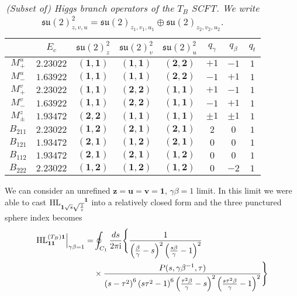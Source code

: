 \documentclass[main.tex]{subfiles}
\begin{document}
\begin{table}
\centering
\begin{tabular}{|c |c|c|c|c|c|c| c|} 
 \hline
 &$E_c$&$\mathfrak{su}(2)^2_{z}$&$\mathfrak{su}(2)_{v}^2$&$\mathfrak{su}(2)^2_{u}$&$q_{\gamma}$&$q_{\beta}$&$q_{t}$\\
  \hline\hline
$M^{u}_{+}$&$2.23022$&$(\mathbf{1},\mathbf{1})$&$(\mathbf{1},\mathbf{1})$&$(\mathbf{2},\mathbf{2})$&$+1$&$-1$&$1$\\
$M^{u}_{-}$&$1.63922$&$(\mathbf{1},\mathbf{1})$&$(\mathbf{1},\mathbf{1})$&$(\mathbf{2},\mathbf{2})$&$-1$&$+1$&$1$\\
$M^{v}_{+}$&$2.23022$&$(\mathbf{1},\mathbf{1})$&$(\mathbf{2},\mathbf{2})$&$(\mathbf{1},\mathbf{1})$&$+1$&$-1$&$1$\\
$M^{v}_{-}$&$1.63922$&$(\mathbf{1},\mathbf{1})$&$(\mathbf{2},\mathbf{2})$&$(\mathbf{1},\mathbf{1})$&$-1$&$+1$&$1$\\
$M^{z}_{\pm}$&$1.93472$&$(\mathbf{2},\mathbf{2})$&$(\mathbf{1},\mathbf{1})$&$(\mathbf{1},\mathbf{1})$&$\pm1$&$\pm1$&$1$\\
$B_{211}$&$2.23022$&$(\mathbf{1},\mathbf{2})$&$(\mathbf{2},\mathbf{1})$&$(\mathbf{2},\mathbf{1})$&$2$&$0$&$1$\\
$B_{121}$&$1.93472$&$(\mathbf{2},\mathbf{1})$&$(\mathbf{1},\mathbf{2})$&$(\mathbf{2},\mathbf{1})$&$0$&$0$&$1$\\
$B_{112}$&$1.93472$&$(\mathbf{2},\mathbf{1})$&$(\mathbf{2},\mathbf{1})$&$(\mathbf{1},\mathbf{2})$&$0$&$0$&$1$\\
$B_{222}$&$2.23022$&$(\mathbf{1},\mathbf{2})$&$(\mathbf{1},\mathbf{2})$&$(\mathbf{1},\mathbf{2})$&$0$&$-2$&$1$\\\hline
\end{tabular}
\caption{\textit{(Subset of) Higgs branch operators of the $T_B$ SCFT. We write \newline$\mathfrak{su}(2)^2_{z,v,u}=\mathfrak{su}(2)_{z_1,v_1,u_1}\oplus\mathfrak{su}(2)_{z_2,v_2,u_2}$.}}
\label{tab:HBOpsTB}
\end{table}
We can consider an unrefined $\mathbf{z}=\mathbf{u}=\mathbf{v}=\mathbf{1}$, $\gamma\beta=1$ limit. In this limit we were able to cast $\HL\indices{_{{\mathbf{1}}{\sqrt{s}}{\sqrt{\frac{1}{s}}}}^{\mathbf{1}}}$ into a relatively closed form and the three punctured sphere index becomes
\begin{equation}
\begin{aligned}
\left.\textrm{HL}^{(T_B)\mathbf{1}}_{\mathbf{1}\mathbf{1}}\right|_{\gamma\beta=1}=&\oint_{C_1}\frac{ds}{2\pi\mathrm{i}}\Bigg\{\frac{1}{\left(\frac{\beta}{\gamma}-s\right)^2 \left( \frac{s\beta}{\gamma}-1\right)^2}\\
&\times\frac{P(s,\gamma\beta^{-1},\tau)}{ \left(s-\tau ^2\right)^6 \left(s \tau ^2-1\right)^6 \left( \frac{\tau ^2\beta}{\gamma}-s\right)^2 \left(\frac{s \tau ^2\beta}{\gamma}-1\right)^2 }\Bigg\}
\end{aligned}
\end{equation}
\end{document}
